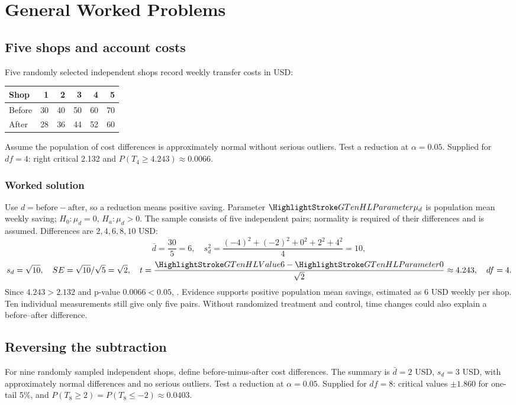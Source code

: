 \section{General Worked Problems}\label{sec:general-worked}
\subsection{Five shops and account costs}\label{prob:raw}
Five randomly selected independent shops record weekly transfer costs in USD:
\begin{center}\begin{tabular}{lrrrrr}\toprule Shop&1&2&3&4&5\\\midrule Before&30&40&50&60&70\\After&28&36&44&52&60\\\bottomrule\end{tabular}\end{center}
Assume the population of cost differences is approximately normal without serious outliers. Test a reduction at $\alpha=0.05$. Supplied for $df=4$: right critical 2.132 and $P(T_4\ge4.243)\approx0.0066$.
\subsubsection*{Worked solution}\label{sol:raw}
Use $d=\text{before}-\text{after}$, so a reduction means positive saving. Parameter $\Pop{\mu_d}$ is population mean weekly saving; $H_0:\mu_d=0$, $H_a:\mu_d>0$. The sample consists of five independent pairs; normality is required of their differences and is assumed. Differences are $2,4,6,8,10$ USD:
\[
\bar d=\frac{30}{5}=6,\quad
s_d^2=\frac{(-4)^2+(-2)^2+0^2+2^2+4^2}{4}=10,
\]
\[
s_d=\sqrt{10},\quad SE=\sqrt{10}/\sqrt5=\sqrt2,\quad
t=\frac{\Obs{6}-\Pop{0}}{\sqrt2}\approx4.243,\quad df=4.
\]
Since $4.243>2.132$ and p-value $0.0066<0.05$, . Evidence supports positive population mean savings, estimated as 6 USD weekly per shop. Ten individual measurements still give only five pairs. Without randomized treatment and control, time changes could also explain a before--after difference.
\subsection{Reversing the subtraction}\label{prob:direction}
For nine randomly sampled independent shops, define before-minus-after cost differences. The summary is $\bar d=2$ USD, $s_d=3$ USD, with approximately normal differences and no serious outliers. Test a reduction at $\alpha=0.05$. Supplied for $df=8$: critical values $\pm1.860$ for one-tail 5\%, and $P(T_8\ge2)=P(T_8\le-2)\approx0.0403$.
